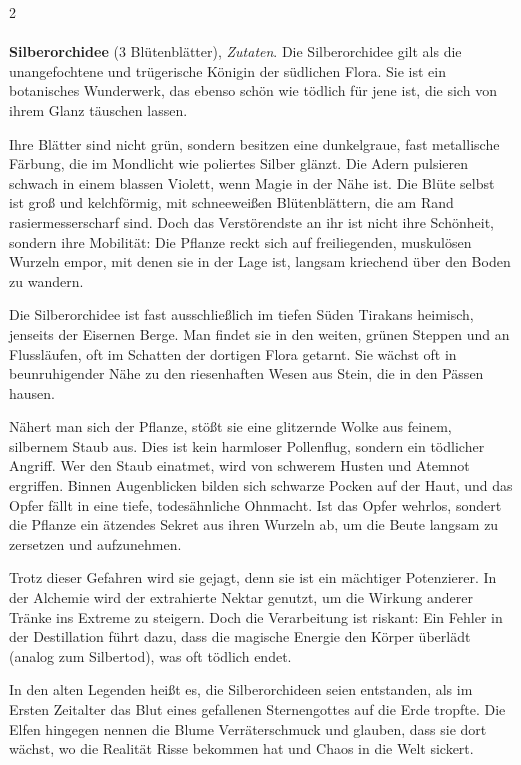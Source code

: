 \begin{multicols}{2}
    \paragraph{}
    \begin{denseitemize}
        \item \textbf{Silberorchidee} (3 Blütenblätter), \textit{Zutaten}.
        Die Silberorchidee gilt als die unangefochtene und trügerische Königin der südlichen Flora. Sie ist ein botanisches Wunderwerk, das ebenso schön wie tödlich für jene ist, die sich von ihrem Glanz täuschen lassen.

Ihre Blätter sind nicht grün, sondern besitzen eine dunkelgraue, fast metallische Färbung, die im Mondlicht wie poliertes Silber glänzt. Die Adern pulsieren schwach in einem blassen Violett, wenn Magie in der Nähe ist. Die Blüte selbst ist groß und kelchförmig, mit schneeweißen Blütenblättern, die am Rand rasiermesserscharf sind. Doch das Verstörendste an ihr ist nicht ihre Schönheit, sondern ihre Mobilität: Die Pflanze reckt sich auf freiliegenden, muskulösen Wurzeln empor, mit denen sie in der Lage ist, langsam kriechend über den Boden zu wandern.

Die Silberorchidee ist fast ausschließlich im tiefen Süden Tirakans heimisch, jenseits der Eisernen Berge. Man findet sie in den weiten, grünen Steppen und an Flussläufen, oft im Schatten der dortigen Flora getarnt. Sie wächst oft in beunruhigender Nähe zu den riesenhaften Wesen aus Stein, die in den Pässen hausen.

Nähert man sich der Pflanze, stößt sie eine glitzernde Wolke aus feinem, silbernem Staub aus. Dies ist kein harmloser Pollenflug, sondern ein tödlicher Angriff. Wer den Staub einatmet, wird von schwerem Husten und Atemnot ergriffen. Binnen Augenblicken bilden sich schwarze Pocken auf der Haut, und das Opfer fällt in eine tiefe, todesähnliche Ohnmacht. Ist das Opfer wehrlos, sondert die Pflanze ein ätzendes Sekret aus ihren Wurzeln ab, um die Beute langsam zu zersetzen und aufzunehmen.

Trotz dieser Gefahren wird sie gejagt, denn sie ist ein mächtiger Potenzierer. In der Alchemie wird der extrahierte Nektar genutzt, um die Wirkung anderer Tränke ins Extreme zu steigern. Doch die Verarbeitung ist riskant: Ein Fehler in der Destillation führt dazu, dass die magische Energie den Körper überlädt (analog zum Silbertod), was oft tödlich endet.

In den alten Legenden heißt es, die Silberorchideen seien entstanden, als im Ersten Zeitalter das Blut eines gefallenen Sternengottes auf die Erde tropfte. Die Elfen hingegen nennen die Blume Verräterschmuck und glauben, dass sie dort wächst, wo die Realität Risse bekommen hat und Chaos in die Welt sickert.


\end{denseitemize}
\end{multicols}
